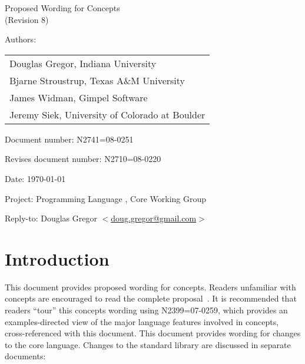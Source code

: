 \documentclass[american]{book}
\begin{document}
\raggedbottom

\begin{titlepage}
\huge
\begin{center}
Proposed Wording for Concepts\\
(Revision 8)
\end{center}

\normalsize
\vspace{0.25in}
\par\noindent Authors: 
\begin{tabular}[t]{l}
Douglas Gregor, Indiana University \\
Bjarne Stroustrup, Texas A\&M University \\
James Widman, Gimpel Software \\
Jeremy Siek, University of Colorado at Boulder
\end{tabular}\vspace{-6pt}

\par\noindent Document number: N2741=08-0251 \vspace{-6pt}
\par\noindent Revises document number: N2710=08-0220 \vspace{-6pt}
\par\noindent Date: \today\vspace{-6pt}
\par\noindent Project: Programming Language \Cpp{}, Core Working Group\vspace{-6pt}
\par\noindent Reply-to: Douglas Gregor $<$\href{mailto:doug.gregor@gmail.com}{doug.gregor@gmail.com}$>$

\section*{Introduction}
This document provides proposed wording for concepts. Readers
unfamiliar with concepts are encouraged to read the complete
proposal~\cite{GregorStroustrup06:concepts_rev_1}. 
%
It is recommended that readers ``tour'' this concepts wording using
N2399=07-0259, which provides an examples-directed view of the major
language features involved in concepts, cross-referenced with this
document.  
%
This document
provides wording for changes to the core language. Changes to the
standard library are discussed in separate documents:


\end{titlepage}
\end{document}
